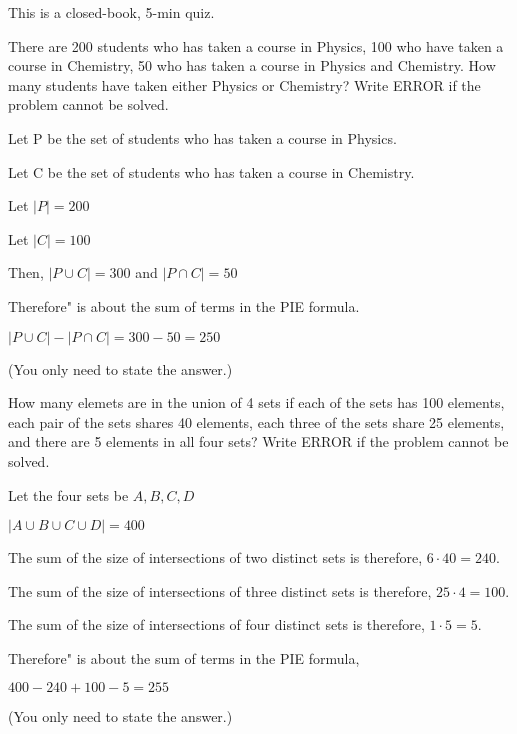 

\renewcommand\AUTHOR{nweadick1@cougars.ccis.edu} %


\topmattertwo

This is a closed-book, 5-min quiz.

\nextq
There are 200 students who has taken a course in Physics,
100 who have taken a course in Chemistry,
50 who has taken a course in Physics and Chemistry.
How many students have taken either Physics or Chemistry?
Write ERROR if the problem cannot be solved.
\\
\ANSWER
\begin{answerlong}
Let P be the set of students who has taken a course in Physics.

Let C be the set of students who has taken a course in Chemistry.

Let $|P| = 200$ 

Let $|C| = 100$

Then, $|P \cup C| = 300$ and $|P \cap C| = 50$

Therefore" is about the sum of terms in the PIE formula.

$|P \cup C| - |P \cap C| = 300 - 50 = 250$

\end{answerlong}
(You only need to state the answer.)

\nextq 
How many elemets are in the union of 4 sets if
each of the sets has 100 elements,
each pair of the sets shares 40 elements,
each three of the sets share 25 elements, and
there are 5 elements in all four sets?
Write ERROR if the problem cannot be solved.
\\
\ANSWER
\begin{answerlong}
Let the four sets be $A,B,C,D$

$|A \cup B \cup C \cup D| = 400$

The sum of the size of intersections of two distinct sets is therefore, $6 \cdot 40 = 240$.

The sum of the size of intersections of three distinct sets is therefore, $25 \cdot 4 = 100$.

The sum of the size of intersections of four distinct sets is therefore, $1 \cdot 5 = 5$.

Therefore" is about the sum of terms in the PIE formula,

$400 - 240 + 100 - 5 = 255$
\end{answerlong}
(You only need to state the answer.)

\newpage


